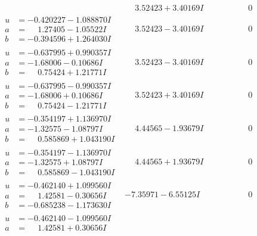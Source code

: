 \documentclass[1p]{elsarticle_modified}
\theoremstyle{definition}
\begin{document}
$$\begin{array}{c|c|c}
 & \phantom{-}3.52423 + 3.40169 I & \phantom{-0.000000 } 0 \\ \hline\begin{aligned}
u &= -0.420227 - 1.088870 I \\
a &= \phantom{-}1.27405 - 1.05522 I \\
b &= -0.394596 + 1.264030 I\end{aligned}
 & \phantom{-}3.52423 - 3.40169 I & \phantom{-0.000000 } 0 \\ \hline\begin{aligned}
u &= -0.637995 + 0.990357 I \\
a &= -1.68006 - 0.10686 I \\
b &= \phantom{-}0.75424 + 1.21771 I\end{aligned}
 & \phantom{-}3.52423 - 3.40169 I & \phantom{-0.000000 } 0 \\ \hline\begin{aligned}
u &= -0.637995 - 0.990357 I \\
a &= -1.68006 + 0.10686 I \\
b &= \phantom{-}0.75424 - 1.21771 I\end{aligned}
 & \phantom{-}3.52423 + 3.40169 I & \phantom{-0.000000 } 0 \\ \hline\begin{aligned}
u &= -0.354197 + 1.136970 I \\
a &= -1.32575 - 1.08797 I \\
b &= \phantom{-}0.585869 + 1.043190 I\end{aligned}
 & \phantom{-}4.44565 - 1.93679 I & \phantom{-0.000000 } 0 \\ \hline\begin{aligned}
u &= -0.354197 - 1.136970 I \\
a &= -1.32575 + 1.08797 I \\
b &= \phantom{-}0.585869 - 1.043190 I\end{aligned}
 & \phantom{-}4.44565 + 1.93679 I & \phantom{-0.000000 } 0 \\ \hline\begin{aligned}
u &= -0.462140 + 1.099560 I \\
a &= \phantom{-}1.42581 - 0.30656 I \\
b &= -0.685238 - 1.173630 I\end{aligned}
 & -7.35971 - 6.55125 I & \phantom{-0.000000 } 0 \\ \hline\begin{aligned}
u &= -0.462140 - 1.099560 I \\
a &= \phantom{-}1.42581 + 0.30656 I \\

\end{aligned}
\end{array}$$
\end{document}
